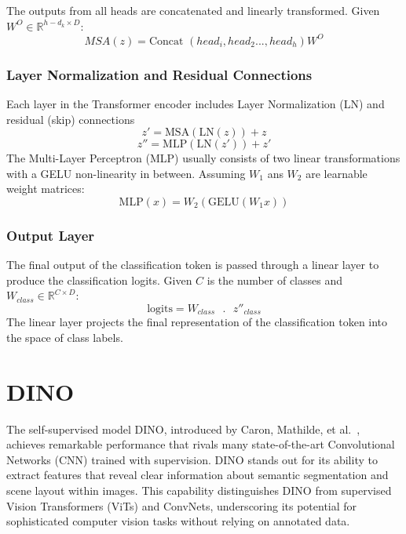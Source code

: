 The outputs from all heads are concatenated and linearly transformed. Given \(W^O \in \mathbb{R}^{h-d_k \times D } \):
\begin{equation}
	MSA(z) = \text{Concat  }(head_i, head_2..., head_h)W^O
\end{equation}

\subsubsection{Layer Normalization and Residual Connections}
Each layer in the Transformer encoder includes Layer Normalization (LN) and residual (skip) connections
\begin{equation}
	z' = \text{MSA}(\text{LN}(z)) + z
\end{equation}
\begin{equation}
	z'' = \text{MLP}(\text{LN}(z')) + z'
\end{equation}
The Multi-Layer Perceptron (MLP) usually consists of two linear transformations with a GELU non-linearity in between. Assuming \(W_1\) ans \(W_2\) are learnable weight matrices:
\begin{equation}
	\text{MLP}(x) = W_2(\text{GELU}(W_1x))
\end{equation}

\subsubsection{Output Layer}
The final output of the classification token is passed through a linear layer to produce the classification logits. Given \(C\) is the number of classes and \(W_{class} \in \mathbb{R}^{C \times D }\):
\begin{equation}
	\text{logits} = W_{class} \text{ }.\text{ } z''_{class}
\end{equation}
The linear layer projects the final representation of the classification token into the space of class labels.

\section{DINO}
The self-supervised model DINO, introduced by Caron, Mathilde, et al.~\cite{caron2021emerging}, achieves remarkable performance that rivals many state-of-the-art Convolutional Networks (CNN) trained with supervision. DINO stands out for its ability to extract features that reveal clear information about semantic segmentation and scene layout within images. This capability distinguishes DINO from supervised Vision Transformers (ViTs) and ConvNets, underscoring its potential for sophisticated computer vision tasks without relying on annotated data.

